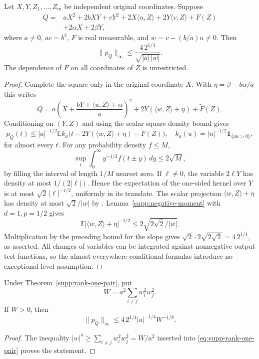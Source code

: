 \begin{theorem}
\label{supp:rank-one-pair}
Let $X,Y,Z_1,\ldots,Z_m$ be independent original coordinates.  Suppose
\begin{align*}
 Q={}&aX^2+2bXY+cY^2+2X\langle u,Z\rangle
       +2Y\langle v,Z\rangle+F(Z)\\
    &+2\alpha X+2\beta Y,
\end{align*}
where $a\ne0$, $ac=b^2$, $F$ is real measurable, and
$w=v-(b/a)u\ne0$.  Then
\begin{equation}\label{eq:supp-rank-one-pair}
 \|p_Q\|_\infty\le
 \frac{4\,2^{1/4}}{\sqrt{|a|\,|w|}}.
\end{equation}
The dependence of $F$ on all coordinates of $Z$ is unrestricted.
\end{theorem}
\begin{proof}
Complete the square only in the original coordinate $X$.  With
$\eta=\beta-b\alpha/a$ this writes
\[
 Q=a\left(X+\frac{bY+\langle u,Z\rangle+\alpha}{a}\right)^2
       +2Y(\langle w,Z\rangle+\eta)+\widetilde F(Z).
\]
Conditioning on $(Y,Z)$ and using the scalar square density bound gives
\[
 p_Q(t)\le |a|^{-1/2}
  \mathbb E k_a\bigl(t-2Y(\langle w,Z\rangle+\eta)
                     -\widetilde F(Z)\bigr),
 \quad k_a(u)=|u|^{-1/2}\mathbf1_{\{au>0\}},
\]
for almost every $t$.  For any probability density $f\le M$,
\[
 \sup_t\int_0^\infty y^{-1/2}f(t\pm y)\,dy\le2\sqrt M,
\]
by filling the interval of length $1/M$ nearest zero.
If $\ell\ne0$, the variable $2\ell Y$ has density at most
$1/(2|\ell|)$.  Hence the expectation of the one-sided kernel
over $Y$ is at most $\sqrt2\,|\ell|^{-1/2}$, uniformly in its
translate.
The scalar projection $\langle w,Z\rangle+\eta$ has density at
most $\sqrt2/|w|$ by \citet{LPP2016}.
Lemma~\ref{supp:negative-moment} with $d=1,p=1/2$ gives
\[
 \mathbb E|\langle w,Z\rangle+\eta|^{-1/2}
 \le2\sqrt{2\sqrt2/|w|}.
\]
Multiplication by the preceding bound for the slope gives
$\sqrt2\cdot2\sqrt{2\sqrt2}=4\,2^{1/4}$, as asserted.
All changes of variables can be integrated against nonnegative output
test functions, so the almost-everywhere conditional formulas introduce
no exceptional-level assumption.
\end{proof}

\begin{corollary}
\label{supp:singular-pair-volume}
Under Theorem~\ref{supp:rank-one-pair}, put
\[
 W=a^2\sum_{i\ne j}w_i^2w_j^2.
\]
If $W>0$, then
\[
 \|p_Q\|_\infty\le
     4\,2^{1/4}|a|^{-1/4}W^{-1/8}.
\]
\end{corollary}
\begin{proof}
The inequality $|w|^4\ge\sum_{i\ne j}w_i^2w_j^2=W/a^2$
inserted into \eqref{eq:supp-rank-one-pair} proves the statement.
\end{proof}

